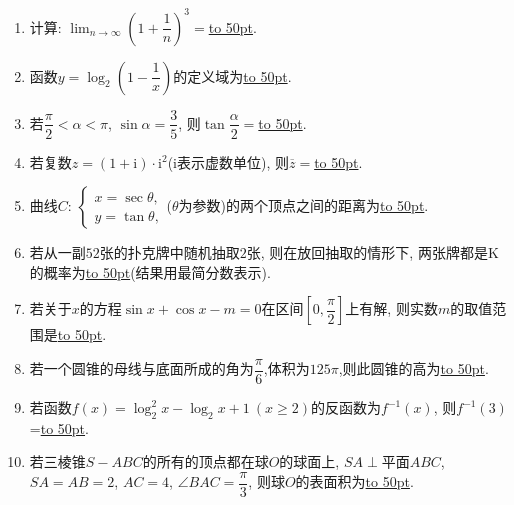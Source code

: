 \documentclass[10pt,a4paper]{article}
\newcommand{\blank}[1]{\underline{\hbox to #1pt{}}}
\begin{document}
\begin{enumerate}[1.]
\item 计算: $\displaystyle\lim_{n\to\infty}(1+\dfrac1n)^3=$\blank{50}.
\item 函数$y=\log_2(1-\dfrac1x)$的定义域为\blank{50}.
\item 若$\dfrac{\pi}2<\alpha<\pi$, $\sin\alpha=\dfrac35$, 则$\tan\dfrac{\alpha}2=$\blank{50}.
\item 若复数$z=(1+\mathrm{i})\cdot \mathrm{i}^2$($\mathrm{i}$表示虚数单位), 则$\overline z=$\blank{50}.
\item 曲线$C$: $\begin{cases} x=\sec\theta, \\ y=\tan\theta, \end{cases}$($\theta$为参数)的两个顶点之间的距离为\blank{50}.
\item 若从一副$52$张的扑克牌中随机抽取$2$张, 则在放回抽取的情形下, 两张牌都是K的概率为\blank{50}(结果用最简分数表示).
\item 若关于$x$的方程$\sin x+\cos x-m=0$在区间$[0,\dfrac{\pi}2]$上有解, 则实数$m$的取值范围是\blank{50}.
\item 若一个圆锥的母线与底面所成的角为$\dfrac{\pi}6$,体积为$125\pi$,则此圆锥的高为\blank{50}.
\item 若函数$f(x)=\log_2^2x-\log_2 x+1 \ (x\ge 2)$的反函数为$f^{-1}(x)$, 则$f^{-1}(3)$=\blank{50}.
\item 若三棱锥$S-ABC$的所有的顶点都在球$O$的球面上, $SA\perp$平面$ABC$, $SA=AB=2$, $AC=4$, $\angle BAC=\dfrac{\pi}3$, 则球$O$的表面积为\blank{50}.



\end{enumerate}
\end{document}

